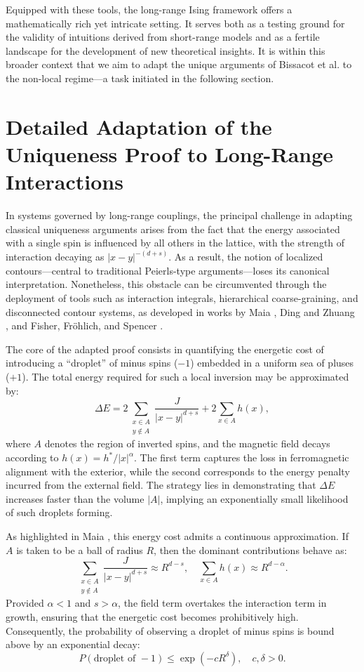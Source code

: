 \documentclass{article}
\begin{document}
Equipped with these tools, the long-range Ising framework offers a mathematically rich yet intricate setting. It serves both as a testing ground for the validity of intuitions derived from short-range models and as a fertile landscape for the development of new theoretical insights. It is within this broader context that we aim to adapt the unique arguments of Bissacot et al. \cite{bissacot2015} to the non-local regime---a task initiated in the following section.

\section{Detailed Adaptation of the Uniqueness Proof to Long-Range Interactions}
\hypertarget{pag5}{}

In systems governed by long-range couplings, the principal challenge in adapting classical uniqueness arguments arises from the fact that the energy associated with a single spin is influenced by all others in the lattice, with the strength of interaction decaying as $|x-y|^{-(d+s)}$. As a result, the notion of localized contours---central to traditional Peierls-type arguments---loses its canonical interpretation. Nonetheless, this obstacle can be circumvented through the deployment of tools such as interaction integrals, hierarchical coarse-graining, and disconnected contour systems, as developed in works by Maia \cite{maia2024}, Ding and Zhuang \cite{ding2024}, and Fisher, Fr\"ohlich, and Spencer \cite{fisher1984}.

The core of the adapted proof consists in quantifying the energetic cost of introducing a ``droplet'' of minus spins ($-1$) embedded in a uniform sea of pluses ($+1$). The total energy required for such a local inversion may be approximated by:
\[
\Delta E = 2\sum_{\substack{x\in A\\ y\notin A}} \frac{J}{|x-y|^{d+s}} + 2\sum_{x\in A} h(x),
\]
where $A$ denotes the region of inverted spins, and the magnetic field decays according to $h(x) = h^*/|x|^\alpha$. The first term captures the loss in ferromagnetic alignment with the exterior, while the second corresponds to the energy penalty incurred from the external field. The strategy lies in demonstrating that $\Delta E$ increases faster than the volume $|A|$, implying an exponentially small likelihood of such droplets forming.

\hypertarget{pag6}{}

As highlighted in Maia \cite{maia2024}, this energy cost admits a continuous approximation. If $A$ is taken to be a ball of radius $R$, then the dominant contributions behave as:
\[
\sum_{\substack{x\in A\\ y\notin A}} \frac{J}{|x-y|^{d+s}} \approx R^{d-s}, \quad \sum_{x\in A} h(x) \approx R^{d-\alpha}.
\]
Provided $\alpha<1$ and $s>\alpha$, the field term overtakes the interaction term in growth, ensuring that the energetic cost becomes prohibitively high. Consequently, the probability of observing a droplet of minus spins is bound above by an exponential decay:
\[
P(\text{droplet of }-1) \leq \exp(-cR^\delta), \quad c,\delta>0.
\]
\end{document}
